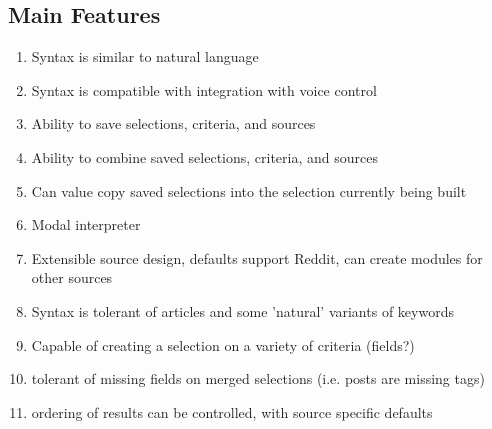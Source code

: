 \subsection{Main Features}
\begin{enumerate}
\item Syntax is similar to natural language
\item Syntax is compatible with integration with voice control
\item Ability to save selections, criteria, and sources
\item Ability to combine saved selections, criteria, and sources
\item Can value copy saved selections into the selection currently being built
\item Modal interpreter
\item Extensible source design, defaults support Reddit, can create modules for other sources
\item Syntax is tolerant of articles and some 'natural' variants of keywords
\item Capable of creating a selection on a variety of criteria (fields?)
\item tolerant of missing fields on merged selections (i.e. posts are missing tags)
\item ordering of results can be controlled, with source specific defaults
\end{enumerate}

